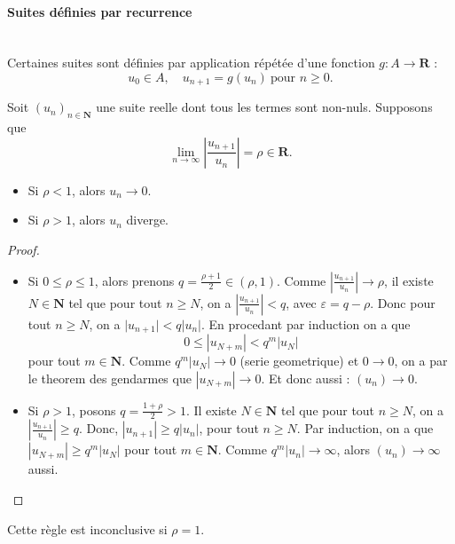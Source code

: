 \paragraph{Suites définies par recurrence}~\\
Certaines suites sont définies par application répétée d'une fonction $g:A\to \mathbf{R}$ :
$$
u_{0}\in A,\quad u_{n+1}=g(u_{n})~\text{pour }n\ge0.
$$
\begin{theorem}
Soit $(u_{n})_{n\in \mathbf{N}}$ une suite reelle dont tous les termes sont non-nuls. Supposons que 
$$
\lim_{ n \to \infty } \left\lvert  \frac{u_{n+1}}{u_{n}}  \right\rvert =\rho \in \mathbf{R}.
$$
\begin{itemize}
\item Si $\rho<1$, alors $u_{n}\to 0$.
\item Si $\rho>1$, alors $u_{n}$ diverge.
\end{itemize}
\end{theorem}
\begin{proof}
\begin{itemize}
\item Si $0\le \rho \le 1$, alors prenons $q=\frac{\rho +1}{2}\in (\rho,1)$. Comme $\left\lvert  \frac{u_{n+1}}{u_{n}}  \right\rvert\to \rho$, il existe $N\in \mathbf{N}$ tel que pour tout $n\ge N$, on a $\left\lvert  \frac{u_{n+1}}{u_{n}}  \right\rvert<q$, avec $\varepsilon=q-\rho$. Donc pour tout $n \ge N$, on a $\lvert u_{n+1} \rvert<q|u_{n}|$. En procedant par induction on a que 
$$
0\le |u_{N+m}|<q^{m}|u_{N}|
$$
pour tout $m\in \mathbf{N}$. Comme $q^{m}|u_{N}|\to 0$ (serie geometrique) et $0\to 0$, on a par le theorem des gendarmes que $|u_{N+m}|\to 0$. Et donc aussi : $(u_{n})\to 0$.
\item Si $\rho>1$, posons $q=\frac{1+\rho}{2}>1$. Il existe $N\in \mathbf{N}$ tel que pour tout $n\ge N$, on a $\left\lvert  \frac{u_{n+1}}{u_{n}}  \right\rvert\ge q$. Donc, $|u_{n+1}|\ge q|u_{n}|$, pour tout $n\ge N$. Par induction, on a que $|u_{N+m}|\ge q^{m}|u_{N}|$ pour tout $m\in \mathbf{N}$. Comme $q^{m}|u_{n}|\to \infty$, alors $(u_{n})\to \infty$ aussi.  
\end{itemize}
\end{proof}
\begin{remark}
Cette règle est inconclusive si $\rho=1$.
\end{remark}

